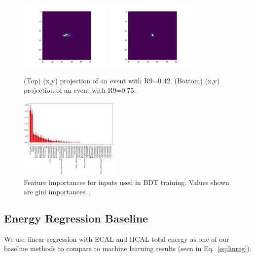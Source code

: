 \begin{figure}[htbp]
\centering
\includegraphics[trim={0 0 0 1cm},clip,width=0.4\textwidth]{Images/Calo/R9_0p42.png}
\includegraphics[trim={0 0 0 1cm},clip,width=0.4\textwidth]{Images/Calo/R9_0p75.png}
\caption{(Top) (x,y) projection of an event with R9=0.42. (Bottom) (x,y) projection of an event with R9=0.75.}
\label{fig:R9_examples}
\end{figure}

\begin{figure}[htbp]
\centering
\includegraphics[width=0.43\textwidth]{Images/Calo/BDT_ranking_fixed.png}
\caption{Feature importances for inputs used in BDT training. Values shown are gini importances~\cite{Breiman}.\label{fig:BDT_ranking}}
\end{figure}

\subsection*{Energy Regression Baseline}\label{app:regression_baseline}

We use linear regression with ECAL and HCAL total energy as one of our baseline methods to compare to machine learning results (seen in Eq.~\ref{eq:linreg}).


